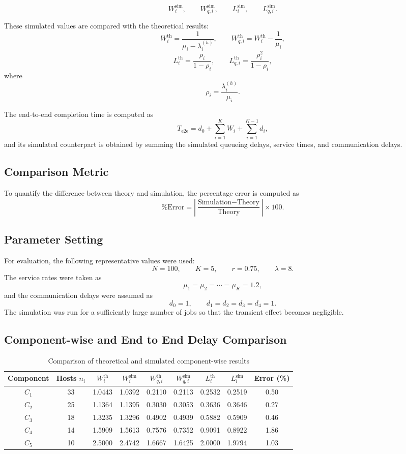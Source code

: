 \documentclass[12pt,a4paper]{article}
\begin{document}
\[
W_i^{\text{sim}}, \qquad W_{q,i}^{\text{sim}}, \qquad L_i^{\text{sim}}, \qquad L_{q,i}^{\text{sim}}.
\]

These simulated values are compared with the theoretical results:
\[
W_i^{\text{th}} = \frac{1}{\mu_i - \lambda_i^{(h)}},
\qquad
W_{q,i}^{\text{th}} = W_i^{\text{th}} - \frac{1}{\mu_i},
\]
\[
L_i^{\text{th}} = \frac{\rho_i}{1-\rho_i},
\qquad
L_{q,i}^{\text{th}} = \frac{\rho_i^2}{1-\rho_i},
\]
where
\[
\rho_i = \frac{\lambda_i^{(h)}}{\mu_i}.
\]

The end-to-end completion time is computed as
\[
T_{\text{e2e}} = d_0 + \sum_{i=1}^{K} W_i + \sum_{i=1}^{K-1} d_i,
\]
and its simulated counterpart is obtained by summing the simulated queueing delays, service times, and communication delays.

\subsection{Comparison Metric}
To quantify the difference between theory and simulation, the percentage error is computed as
\[
\%\text{Error} = \left|\frac{\text{Simulation} - \text{Theory}}{\text{Theory}}\right| \times 100.
\]

\subsection{Parameter Setting}
For evaluation, the following representative values were used:
\[
N = 100,\qquad K = 5,\qquad r = 0.75,\qquad \lambda = 8.
\]
The service rates were taken as
\[
\mu_1 = \mu_2 = \cdots = \mu_K = 1.2,
\]
and the communication delays were assumed as
\[
d_0 = 1, \qquad d_1 = d_2 = d_3 = d_4 = 1.
\]
The simulation was run for a sufficiently large number of jobs so that the transient effect becomes negligible.

\subsection{Component-wise and End to End Delay Comparison}

\begin{table}[h!]
\centering
\caption{Comparison of theoretical and simulated component-wise results}
\label{tab:evaluation_componentwise}
\begin{tabular}{c c c c c c c c c}
\hline
Component & Hosts $n_i$ & $W_i^{\text{th}}$ & $W_i^{\text{sim}}$ & $W_{q,i}^{\text{th}}$ & $W_{q,i}^{\text{sim}}$ & $L_i^{\text{th}}$ & $L_i^{\text{sim}}$ & Error (\%) \\
\hline
$C_1$ & 33 & 1.0443 & 1.0392 & 0.2110 & 0.2113 & 0.2532 & 0.2519 & 0.50 \\
$C_2$ & 25 & 1.1364 & 1.1395 & 0.3030 & 0.3053 & 0.3636 & 0.3646 & 0.27 \\
$C_3$ & 18 & 1.3235 & 1.3296 & 0.4902 & 0.4939 & 0.5882 & 0.5909 & 0.46 \\
$C_4$ & 14 & 1.5909 & 1.5613 & 0.7576 & 0.7352 & 0.9091 & 0.8922 & 1.86 \\
$C_5$ & 10 & 2.5000 & 2.4742 & 1.6667 & 1.6425 & 2.0000 & 1.9794 & 1.03 \\
\hline
\end{tabular}
\end{table}
\end{document}
